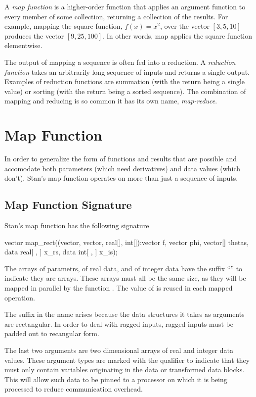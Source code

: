 A {\slshape map function} is a higher-order function that applies an
argument function to every member of some collection, returning a
collection of the results.  For example, mapping the square function,
$f(x) = x^2$, over the vector $[3, 5, 10]$ produces the vector
$[9, 25, 100]$.  In other words, map applies the square function
elementwise.

The output of mapping a sequence is often fed into a reduction.
A {\slshape reduction function} takes an arbitrarily long sequence of
inputs and returns a single output.  Examples of reduction functions
are summation (with the return being a single value) or sorting (with
the return being a sorted sequence).  The combination of mapping and
reducing is so common it has its own name, {\slshape map-reduce}.

\section{Map Function}

In order to generalize the form of functions and results that are
possible and accomodate both parameters (which need derivatives) and
data values (which don't), Stan's map function operates on more than
just a sequence of inputs.

\subsection{Map Function Signature}

Stan's map function has the following signature
%
\begin{stancode}
vector map_rect((vector, vector, real[], int[]):vector f,
                vector phi, vector[] thetas,
                data real[ , ] x_rs, data int[ , ] x_is);
\end{stancode}
%
The arrays  of parametrs,  of real data, and
 of integer data have the suffix ``'' to indicate they
are arrays.  These arrays must all be the same size, as they will be
mapped in parallel by the function .  The value of 
is reused in each mapped operation.

The  suffix in the name arises because the data
structures it takes as arguments are rectangular.  In order to deal
with ragged inputs, ragged inputs must be padded out to recangular
form.

The last two arguments are two dimensional arrays of real and integer
data values.  These argument types are marked with the 
qualifier to indicate that they must only contain variables
originating in the data or transformed data blocks.  This will allow
such data to be pinned to a processor on which it is being processed
to reduce communication overhead.

